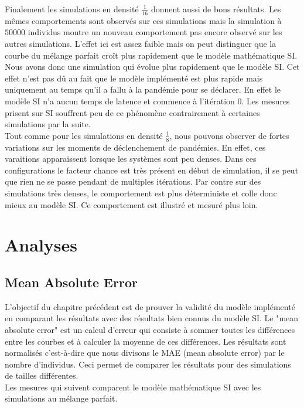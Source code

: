 Finalement les simulations en densité $\frac{1}{16}$ donnent aussi de bons résultats. Les mêmes comportements sont observés sur ces simulations mais la simulation à $50000$ individus montre un nouveau comportement pas encore observé sur les autres simulations. L'effet ici est assez faible mais on peut distinguer que la courbe du mélange parfait croît plus rapidement que le modèle mathématique SI. Nous avons donc une simulation qui évolue plus rapidement que le modèle SI. Cet effet n'est pas dû au fait que le modèle implémenté est plus rapide mais uniquement au temps qu'il a fallu à la pandémie pour se déclarer. En effet le modèle SI n'a aucun temps de latence et commence à l'itération $0$. Les mesures prisent sur SI souffrent peu de ce phénomène contrairement à certaines simulations par la suite. \\

Tout comme pour les simulations en densité $\frac{1}{8}$, nous pouvons observer de fortes variations sur les moments de déclenchement de pandémies. En effet, ces varaitions apparaissent lorsque les systèmes sont peu denses. Dans ces configurations le facteur chance est très présent en début de simulation, il se peut que rien ne se passe pendant de multiples itérations. Par contre sur des simulations très denses, le comportement est plus déterministe et colle donc mieux au modèle SI. Ce comportement est illustré et mesuré plus loin.

\section{Analyses}

\subsection{Mean Absolute Error}

L'objectif du chapitre précédent est de prouver la validité du modèle implémenté en comparant les résultats avec des résultats bien connus du modèle SI. Le "mean absolute error" est un calcul d'erreur qui consiste à sommer toutes les différences entre les courbes et à calculer la moyenne de ces différences. Les résultats sont normalisés c'est-à-dire que nous divisons le MAE (mean absolute error) par le nombre d'individus. Ceci permet de comparer les résultats pour des simulations de tailles différentes.\\

Les mesures qui suivent comparent le modèle mathématique SI avec les simulations au mélange parfait.

